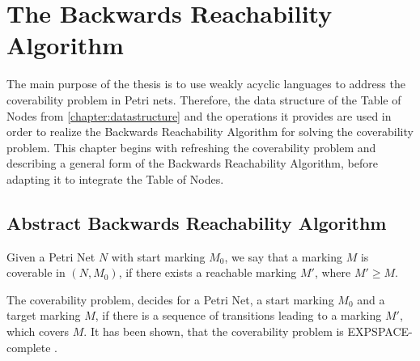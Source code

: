 \chapter{The Backwards Reachability Algorithm}\label{chapter:coverability}

The main purpose of the thesis is to use weakly acyclic languages to address the coverability problem in Petri nets. Therefore, the data structure of the Table of Nodes from \autoref{chapter:datastructure} and the operations it provides are used in order to realize the Backwards Reachability Algorithm for solving the coverability problem. This chapter begins with refreshing the coverability problem and describing a general form of the Backwards Reachability Algorithm, before adapting it to integrate the  Table of Nodes.

\section{Abstract Backwards Reachability Algorithm}\label{sec:abstractbw} 
Given a Petri Net $N$ with start marking $M_{0}$, we say that a marking $M$ is coverable in $(N,M_{0})$, if there exists a reachable marking $M'$, where $M'\ge M$. 

The coverability problem, decides for a Petri Net, a start marking $M_{0}$ and a target marking $M$, if there is a sequence of transitions leading to a marking $M'$, which covers $M$. It has been shown, that the coverability problem is EXPSPACE-complete \cite{lipton_76,rackoff_78}. 

